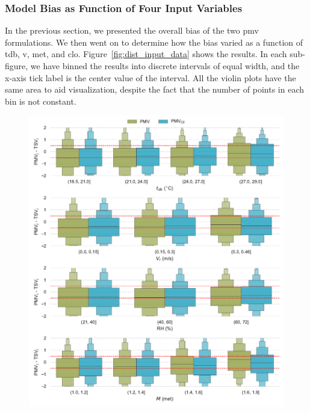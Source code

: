 \subsubsection{Model Bias as Function of Four Input Variables}\label{subsec:model-bias-variable}
In the previous section, we presented the overall bias of the two \ac{pmv} formulations.
We then went on to determine how the bias varied as a function of \ac{tdb}, \ac{v}, \ac{met}, and \ac{clo}.
Figure~\ref{fig:dist_input_data} shows the results.
In each sub-figure, we have binned the results into discrete intervals of equal width, and the x-axis tick label is the center value of the interval.
All the violin plots have the same area to aid visualization, despite the fact that the number of points in each bin is not constant.
\begin{figure}[htb!]
    \centering
    \includegraphics[width=\textwidth]{figures/bias_models}
    \caption{}
    \label{fig:bias_models}
\end{figure}

